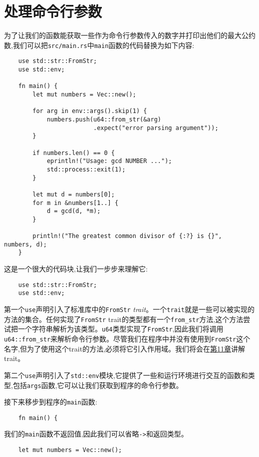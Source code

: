 \section{处理命令行参数}
为了让我们的函数能获取一些作为命令行参数传入的数字并打印出他们的最大公约数,我们可以把\texttt{src/main.rs}中\texttt{main}函数的代码替换为如下内容:
\begin{verbatim}
    use std::str::FromStr;
    use std::env;

    fn main() {
        let mut numbers = Vec::new();

        for arg in env::args().skip(1) {
            numbers.push(u64::from_str(&arg)
                         .expect("error parsing argument"));
        }

        if numbers.len() == 0 {
            eprintln!("Usage: gcd NUMBER ...");
            std::process::exit(1);
        }

        let mut d = numbers[0];
        for m in &numbers[1..] {
            d = gcd(d, *m);
        }

        println!("The greatest common divisor of {:?} is {}",   numbers, d);
    }
\end{verbatim}

这是一个很大的代码块,让我们一步步来理解它:
\begin{verbatim}
    use std::str::FromStr;
    use std::env;
\end{verbatim}

第一个\texttt{use}声明引入了标准库中的\texttt{FromStr} \emph{trait}。一个\texttt{trait}就是一些可以被实现的方法的集合。任何实现了\texttt{FromStr} trait的类型都有一个\texttt{from\_str}方法,这个方法尝试把一个字符串解析为该类型。\texttt{u64}类型实现了\texttt{FromStr},因此我们将调用\texttt{u64::from\_str}来解析命令行参数。尽管我们在程序中并没有使用到\texttt{FromStr}这个名字,但为了使用这个trait的方法,必须将它引入作用域。我们将会在\hyperref[ch11]{第11章}讲解trait。

第二个\texttt{use}声明引入了\texttt{std::env}模块,它提供了一些和运行环境进行交互的函数和类型,包括\texttt{args}函数,它可以让我们获取到程序的命令行参数。

接下来移步到程序的\texttt{main}函数:
\begin{verbatim}
    fn main() {
\end{verbatim}

我们的\texttt{main}函数不返回值,因此我们可以省略\texttt{->}和返回类型。

\begin{verbatim}
    let mut numbers = Vec::new();
\end{verbatim}

